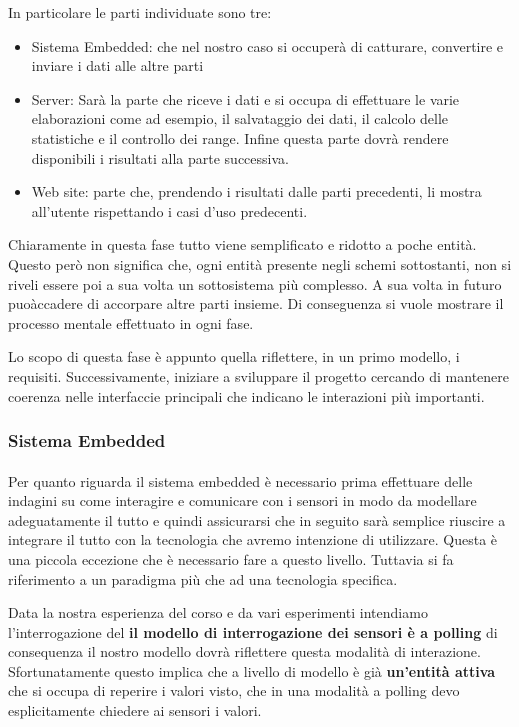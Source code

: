 In particolare le parti individuate sono tre:

\begin{itemize}
  \item Sistema Embedded: che nel nostro caso si occuper\`a di catturare, convertire e inviare i dati alle altre parti
  \item Server: Sar\`a la parte che riceve i dati e si occupa di effettuare le varie elaborazioni come ad esempio, il salvataggio dei dati, il calcolo delle statistiche e il controllo dei range. Infine questa parte dovr\`a rendere disponibili i risultati alla parte successiva.
  \item Web site: parte che, prendendo i risultati dalle parti precedenti, li mostra all'utente rispettando i casi d'uso predecenti.
\end{itemize}

Chiaramente in questa fase tutto viene semplificato e ridotto a poche entit\`a. Questo per\`o non significa che, ogni entit\`a presente negli schemi sottostanti, non si riveli essere poi a sua volta un sottosistema pi\`u complesso. A sua volta in futuro puo\` accadere di accorpare altre parti insieme. Di conseguenza si vuole mostrare il processo mentale effettuato in ogni fase.

Lo scopo di questa fase \`e appunto quella riflettere, in un primo modello, i requisiti. Successivamente, iniziare a sviluppare il progetto cercando di mantenere coerenza nelle interfaccie principali che indicano le interazioni pi\`u importanti.

\newpage

\subsubsection{Sistema Embedded}

\paragraph{}Per quanto riguarda il sistema embedded \`e necessario prima effettuare delle indagini su come interagire e comunicare con i sensori in modo da modellare adeguatamente il tutto e quindi assicurarsi che in seguito sar\`a semplice riuscire a integrare il tutto con la tecnologia che avremo intenzione di utilizzare. Questa \`e una piccola eccezione che \`e necessario fare a questo livello. Tuttavia si fa riferimento a un paradigma pi\`u che ad una tecnologia specifica.

Data la nostra esperienza del corso e da vari esperimenti intendiamo l'interrogazione del \textbf{il modello di interrogazione dei sensori \`e a polling} di consequenza il nostro modello dovr\`a riflettere questa modalit\`a di interazione. Sfortunatamente questo implica che a livello di modello \`e gi\`a \textbf{un'entit\`a attiva} che si occupa di reperire i valori visto, che in una modalit\`a a polling devo esplicitamente chiedere ai sensori i valori.

